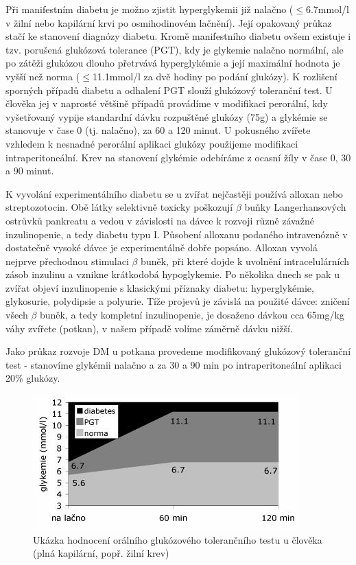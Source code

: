 \documentclass[12pt]{article}
\begin{document}
Při manifestním diabetu je možno zjistit hyperglykemii již nalačno ($\le$6.7mmol/l v žilní nebo
kapilární krvi po osmihodinovém lačnění). Její opakovaný průkaz stačí ke stanovení diagnózy
diabetu. Kromě manifestního diabetu ovšem existuje i tzv. porušená glukózová tolerance (PGT),
kdy je glykemie nalačno normální, ale po zátěži glukózou dlouho přetrvává hyperglykémie a její
maximální hodnota je vyšší než norma ($\le$11.1mmol/l za dvě hodiny po podání glukózy). K
rozlišení sporných případů diabetu a odhalení PGT slouží glukózový toleranční test. U člověka
jej v naprosté většině případů provádíme v modifikaci perorální, kdy vyšetřovaný vypije
standardní dávku rozpuštěné glukózy (75g) a glykémie se stanovuje v čase 0 (tj. nalačno), za 60 a
120 minut. U pokusného zvířete vzhledem k nesnadné perorální aplikaci glukózy použijeme
modifikaci intraperitoneální. Krev na stanovení glykémie odebíráme z ocasní žíly v čase 0, 30 a
90 minut.

K vyvolání experimentálního diabetu se u zvířat nejčastěji používá alloxan nebo streptozotocin.
Obě látky selektivně toxicky poškozují $\beta$ buňky Langerhansových ostrůvků pankreatu a vedou v
závislosti na dávce k rozvoji různě závažné inzulinopenie, a tedy diabetu typu I. Působení
alloxanu podaného intravenózně v dostatečně vysoké dávce je experimentálně dobře popsáno.
Alloxan vyvolá nejprve přechodnou stimulaci $\beta$ buněk, při které dojde k uvolnění intracelulárních
zásob inzulinu a vznikne krátkodobá hypoglykemie. Po několika dnech se pak u zvířat objeví
inzulinopenie s klasickými příznaky diabetu: hyperglykémie, glykosurie, polydipsie a polyurie.
Tíže projevů je závislá na použité dávce: zničení všech $\beta$ buněk, a tedy kompletní inzulinopenie,
je dosaženo dávkou cca 65mg/kg váhy zvířete (potkan), v našem případě volíme záměrně dávku
nižší.

Jako průkaz rozvoje DM u potkana provedeme modifikovaný glukózový toleranční test -
stanovíme glykémii nalačno a za 30 a 90 min po intraperitoneální aplikaci 20\% glukózy.

\begin{figure}
	\begin{centering}
	\includegraphics[width=0.6\linewidth]{DM.jpg}
	\caption{Ukázka hodnocení orálního glukózového tolerančního testu u člověka (plná kapilární,
popř. žilní krev)}
	\end{centering}
\end{figure}
\end{document}
